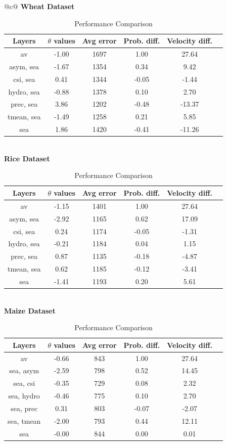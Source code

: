 \begin{table}[ht]
\centering
\caption{Performance Comparison}
\label{tab:results}
\begin{tabular}{@{}c@{}}
\toprule
\textbf{Wheat Dataset}\\
\begin{tabular}{cccccc}
\toprule
Layers & $\theta$ values & Avg error & Prob. diff. & Velocity diff. \\ 
\midrule
av & -1.00 & 1697 & 1.00 & 27.64 \\ 
asym, sea & -1.67 & 1354 & 0.34 & 9.42 \\ 
csi, sea & 0.41 & 1344 & -0.05 & -1.44 \\ 
hydro, sea & -0.88 & 1378 & 0.10 & 2.70 \\ 
prec, sea & 3.86 & 1202 & -0.48 & -13.37 \\ 
tmean, sea & -1.49 & 1258 & 0.21 & 5.85 \\ 
sea & 1.86 & 1420 & -0.41 & -11.26 \\ 
\bottomrule
\end{tabular}
\\[2ex]
\textbf{Rice Dataset}\\
\begin{tabular}{cccccc}
\toprule
Layers & $\theta$ values & Avg error & Prob. diff. & Velocity diff. \\ 
\midrule
av & -1.15 & 1401 & 1.00 & 27.64 \\ 
asym, sea & -2.92 & 1165 & 0.62 & 17.09 \\ 
csi, sea & 0.24 & 1174 & -0.05 & -1.31 \\ 
hydro, sea & -0.21 & 1184 & 0.04 & 1.15 \\ 
prec, sea & 0.87 & 1135 & -0.18 & -4.87 \\ 
tmean, sea & 0.62 & 1185 & -0.12 & -3.41 \\ 
sea & -1.41 & 1193 & 0.20 & 5.61 \\ 
\bottomrule
\end{tabular}
\\[2ex]
\textbf{Maize Dataset}\\
\begin{tabular}{cccccc}
\toprule
Layers & $\theta$ values & Avg error & Prob. diff. & Velocity diff. \\ 
\midrule
av & -0.66 & 843 & 1.00 & 27.64 \\ 
sea, asym & -2.59 & 798 & 0.52 & 14.45 \\ 
sea, csi & -0.35 & 729 & 0.08 & 2.32 \\ 
sea, hydro & -0.46 & 775 & 0.10 & 2.70 \\ 
sea, prec & 0.31 & 803 & -0.07 & -2.07 \\ 
sea, tmean & -2.00 & 793 & 0.44 & 12.11 \\ 
sea & -0.00 & 844 & 0.00 & 0.01 \\ 
\bottomrule
\end{tabular}
\bottomrule
\end{tabular}
\end{table}
